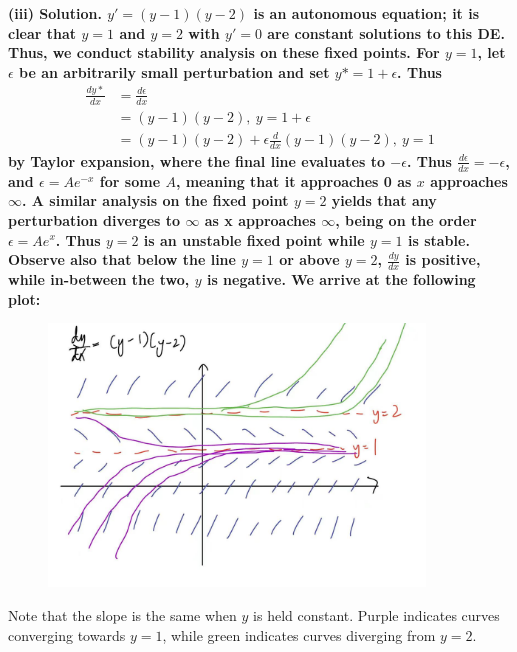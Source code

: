 \documentclass{article}
\begin{document}
\bf (iii) Solution. \normalfont $y' = (y-1)(y-2)$ is an autonomous equation; it is clear that $y = 1$ and $y=2$ with $y'=0$ are constant solutions to this DE. Thus, we conduct stability analysis on these fixed points. For $y = 1$, let $\epsilon$ be an arbitrarily small perturbation and set $y* = 1+ \epsilon$. Thus
\begin{equation*}
    \begin{aligned}
        \frac{dy*}{dx} &= \frac{d\epsilon}{dx} \\
        &= (y-1)(y-2),\ y=1+\epsilon \\
        &= (y-1)(y-2) + \epsilon \frac{d}{dx} (y-1)(y-2),\ y=1
    \end{aligned}
\end{equation*}
by Taylor expansion, where the final line evaluates to $-\epsilon$. Thus $\frac{d\epsilon}{dx} = -\epsilon$, and $\epsilon = Ae^{-x}$ for some $A$, meaning that it approaches 0 as $x$ approaches $\infty$. A similar analysis on the fixed point $y=2$ yields that any perturbation diverges to $\infty$ as x approaches $\infty$, being on the order $\epsilon = Ae^x$. Thus $y=2$ is an unstable fixed point while $y=1$ is stable. Observe also that below the line $y=1$ or above $y=2$, $\frac{dy}{dx}$ is positive, while in-between the two, $y$ is negative. We arrive at the following plot:
\newpage
\begin{figure}[h]
    \centering
    \includegraphics[width=10cm]{DE-ch2-8-3.jpg}
\end{figure}
Note that the slope is the same when $y$ is held constant. Purple indicates curves converging towards $y=1$, while green indicates curves diverging from $y=2$.\\

\hrulefill
\end{document}
